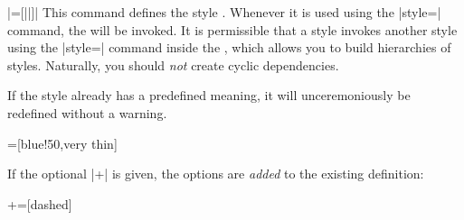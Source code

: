 \begin{command}{\tikzstyle{}\opt{|+|}|=[||]|}
  This command defines the style . Whenever it is
  used using the |style=| command, the 
  will be invoked. It is permissible that a style invokes another
  style using the |style=| command inside the , which
  allows you to build hierarchies of styles. Naturally, you should
  \emph{not} create cyclic dependencies.

  If the style already has a predefined meaning, it will
  unceremoniously be redefined without a warning.
\begin{codeexample}[]
=[blue!50,very thin]
\end{codeexample}

  If the optional |+| is given, the options are \emph{added} to the
  existing definition:
\begin{codeexample}[]
+=[dashed]%
\end{codeexample}
\end{command}

